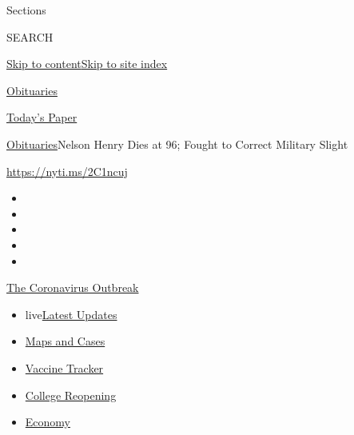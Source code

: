 Sections

SEARCH

\protect\hyperlink{site-content}{Skip to
content}\protect\hyperlink{site-index}{Skip to site index}

\href{https://www.nytimes.com/section/obituaries}{Obituaries}

\href{https://myaccount.nytimes.com/auth/login?response_type=cookie\&client_id=vi}{}

\href{https://www.nytimes.com/section/todayspaper}{Today's Paper}

\href{/section/obituaries}{Obituaries}\textbar{}Nelson Henry Dies at 96;
Fought to Correct Military Slight

\url{https://nyti.ms/2C1ncuj}

\begin{itemize}
\item
\item
\item
\item
\item
\end{itemize}

\href{https://www.nytimes.com/news-event/coronavirus?action=click\&pgtype=Article\&state=default\&region=TOP_BANNER\&context=storylines_menu}{The
Coronavirus Outbreak}

\begin{itemize}
\tightlist
\item
  live\href{https://www.nytimes.com/2020/08/03/world/coronavirus-covid-19.html?action=click\&pgtype=Article\&state=default\&region=TOP_BANNER\&context=storylines_menu}{Latest
  Updates}
\item
  \href{https://www.nytimes.com/interactive/2020/us/coronavirus-us-cases.html?action=click\&pgtype=Article\&state=default\&region=TOP_BANNER\&context=storylines_menu}{Maps
  and Cases}
\item
  \href{https://www.nytimes.com/interactive/2020/science/coronavirus-vaccine-tracker.html?action=click\&pgtype=Article\&state=default\&region=TOP_BANNER\&context=storylines_menu}{Vaccine
  Tracker}
\item
  \href{https://www.nytimes.com/2020/08/02/us/covid-college-reopening.html?action=click\&pgtype=Article\&state=default\&region=TOP_BANNER\&context=storylines_menu}{College
  Reopening}
\item
  \href{https://www.nytimes.com/live/2020/08/03/business/stock-market-today-coronavirus?action=click\&pgtype=Article\&state=default\&region=TOP_BANNER\&context=storylines_menu}{Economy}
\end{itemize}

